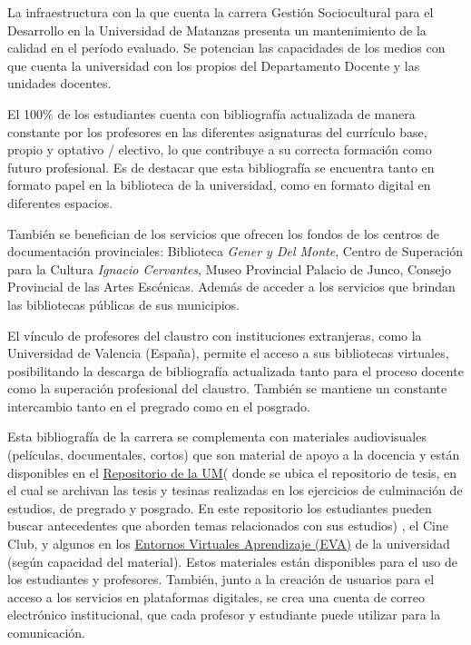 La infraestructura con la que cuenta la carrera Gestión Sociocultural para el Desarrollo en la Universidad de Matanzas presenta un mantenimiento de la calidad en el período evaluado. Se potencian las capacidades de los medios con que cuenta la universidad con los propios del Departamento Docente y las unidades docentes.

El 100\% de los estudiantes cuenta con bibliografía actualizada de manera constante por los profesores en las diferentes asignaturas del currículo base, propio y optativo / electivo, lo que contribuye a su correcta formación como futuro profesional. Es de destacar que esta bibliografía se encuentra tanto en formato papel en la biblioteca de la universidad, como en formato digital en diferentes espacios.

También se benefician de los servicios que ofrecen los fondos de los centros de documentación provinciales: Biblioteca \emph{Gener y Del Monte}, Centro de Superación para la Cultura \emph{Ignacio Cervantes}, Museo Provincial Palacio de Junco, Consejo Provincial de las Artes Escénicas. Además de acceder a los servicios que brindan las bibliotecas públicas de sus municipios.

El vínculo de profesores del claustro con instituciones extranjeras, como la Universidad de Valencia (España), permite el acceso a sus bibliotecas virtuales, posibilitando la descarga de bibliografía actualizada tanto para el proceso docente como la superación profesional del claustro. También se mantiene un constante intercambio tanto en el pregrado como en el posgrado.

Esta bibliografía de la carrera se complementa con materiales audiovisuales (películas, documentales, cortos) que son material de apoyo a la docencia y están disponibles en el \href{http://rein.umcc.cu/}{Repositorio de la UM}( donde se ubica el repositorio de tesis, en el cual se archivan las tesis y tesinas realizadas en los ejercicios de culminación de estudios, de pregrado y posgrado. En este repositorio los estudiantes pueden buscar antecedentes que aborden temas relacionados con sus estudios) , el Cine Club, y algunos en los \href{https://eva.umcc.cu/}{Entornos Virtuales Aprendizaje (EVA)} de la universidad (según capacidad del material). Estos materiales están disponibles para el uso de los estudiantes y profesores. También, junto a la creación de usuarios para el acceso a los servicios en plataformas digitales, se crea una cuenta de correo electrónico institucional, que cada profesor y estudiante puede utilizar para la comunicación.

